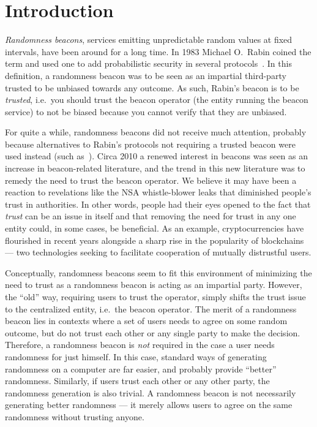 \section{Introduction}
\emph{Randomness beacons}, services emitting unpredictable random values at fixed intervals, have been around for a long time.
In 1983 Michael O.\ Rabin coined the term and used one to add probabilistic security in several protocols~\cite{rabin1983transaction}.
In this definition, a randomness beacon was to be seen as an impartial third-party trusted to be unbiased towards any outcome.
As such, Rabin's beacon is to be \emph{trusted}, i.e.\ you should trust the beacon operator (the entity running the beacon service) to not be biased because you cannot verify that they are unbiased.

For quite a while, randomness beacons did not receive much attention, probably because alternatives to Rabin's protocols not requiring a trusted beacon were used instead (such as~\cite{BGMR}).
Circa 2010 a renewed interest in beacons was seen as an increase in beacon-related literature, and the trend in this new literature was to remedy the need to trust the beacon operator.
We believe it may have been a reaction to revelations like the NSA whistle-blower leaks that diminished people's trust in authorities.
In other words, people had their eyes opened to the fact that \emph{trust} can be an issue in itself and that removing the need for trust in any one entity could, in some cases, be beneficial.
As an example, cryptocurrencies have flourished in recent years alongside a sharp rise in the popularity of blockchains --- two technologies seeking to facilitate cooperation of mutually distrustful users.

Conceptually, randomness beacons seem to fit this environment of minimizing the need to trust as a randomness beacon is acting as an impartial party.
However, the \enquote{old} way, requiring users to trust the operator, simply shifts the trust issue to the centralized entity, i.e.\ the beacon operator.
The merit of a randomness beacon lies in contexts where a set of users needs to agree on some random outcome, but do not trust each other or any single party to make the decision.
Therefore, a randomness beacon is \emph{not} required in the case a user needs randomness for just himself. In this case, standard ways of generating randomness on a computer are far easier, and probably provide \enquote{better} randomness.
Similarly, if users trust each other or any other party, the randomness generation is also trivial.
A randomness beacon is not necessarily generating better randomness --- it merely allows users to agree on the same randomness without trusting anyone.


